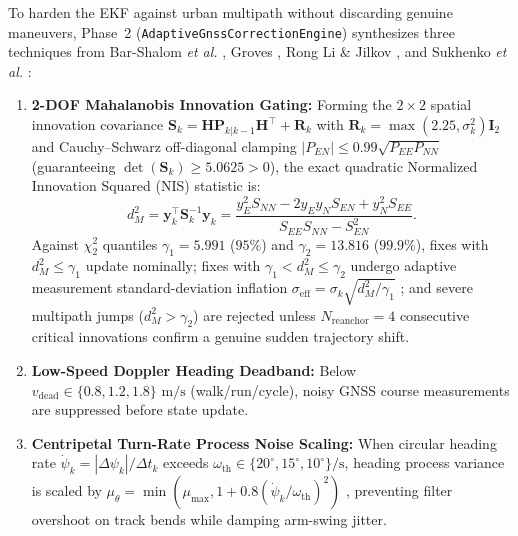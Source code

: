 \documentclass[journal]{IEEEtran}
\begin{document}
To harden the EKF against urban multipath without discarding genuine maneuvers, Phase~2 (\texttt{AdaptiveGnssCorrectionEngine}) synthesizes three techniques from Bar-Shalom \emph{et al.} \cite{barshalom2001estimation}, Groves \cite{groves2013principles}, Rong Li \& Jilkov \cite{rongli2003survey}, and Sukhenko \emph{et al.} \cite{sukhenko2025gnss}:
\begin{enumerate}
  \item \textbf{2-DOF Mahalanobis Innovation Gating:} Forming the $2\times 2$ spatial innovation covariance $\mathbf{S}_k = \mathbf{H}\mathbf{P}_{k|k-1}\mathbf{H}^\top + \mathbf{R}_k$ with $\mathbf{R}_k = \max(2.25, \sigma_k^2)\mathbf{I}_2$ and Cauchy--Schwarz off-diagonal clamping $|P_{EN}| \le 0.99\sqrt{P_{EE}P_{NN}}$ (guaranteeing $\det(\mathbf{S}_k) \ge 5.0625 > 0$), the exact quadratic Normalized Innovation Squared (NIS) statistic is:
  \begin{equation}
    d_M^2 = \mathbf{y}_k^\top \mathbf{S}_k^{-1} \mathbf{y}_k = \frac{y_E^2 S_{NN} - 2 y_E y_N S_{EN} + y_N^2 S_{EE}}{S_{EE}S_{NN} - S_{EN}^2}.
    \label{eq:nis}
  \end{equation}
  Against $\chi^2_2$ quantiles $\gamma_1 = 5.991$ ($95\%$) and $\gamma_2 = 13.816$ ($99.9\%$), fixes with $d_M^2 \le \gamma_1$ update nominally; fixes with $\gamma_1 < d_M^2 \le \gamma_2$ undergo adaptive measurement standard-deviation inflation $\sigma_{\text{eff}} = \sigma_k\sqrt{d_M^2 / \gamma_1}$ \cite{groves2013principles}; and severe multipath jumps ($d_M^2 > \gamma_2$) are rejected unless $N_{\text{reanchor}} = 4$ consecutive critical innovations confirm a genuine sudden trajectory shift.
  \item \textbf{Low-Speed Doppler Heading Deadband:} Below $v_{\text{dead}} \in \{0.8, 1.2, 1.8\}\text{ m/s}$ (walk/run/cycle), noisy GNSS course measurements are suppressed before state update.
  \item \textbf{Centripetal Turn-Rate Process Noise Scaling:} When circular heading rate $\dot{\psi}_k = |\Delta\psi_k|/\Delta t_k$ exceeds $\omega_{\text{th}} \in \{20^\circ, 15^\circ, 10^\circ\}\text{/s}$, heading process variance is scaled by $\mu_\theta = \min(\mu_{\max}, 1 + 0.8(\dot{\psi}_k/\omega_{\text{th}})^2)$ \cite{rongli2003survey}, preventing filter overshoot on track bends while damping arm-swing jitter.
\end{enumerate}
\end{document}
